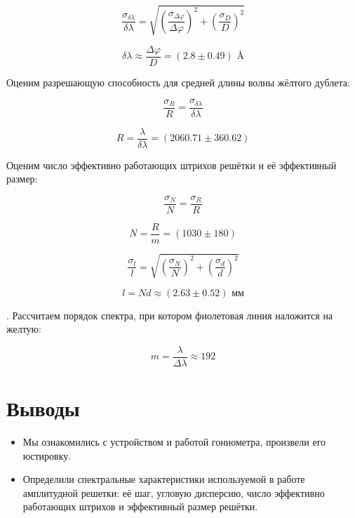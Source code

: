 \documentclass[a4paper, 12pt]{article}
\begin{document}
\[\dfrac{\sigma_{\delta \lambda}}{\delta \lambda} = \sqrt{\left(\dfrac{\sigma_{\Delta \varphi}}{\Delta \varphi}\right)^2 + \left(\dfrac{\sigma_D}{D}\right)^2}\]

\[\delta \lambda \approx \dfrac{\Delta \varphi}{D} = (2.8 \pm 0.49) \text{ \AA}\]

Оценим разрешающую способность для средней длины волны жёлтого дублета:

\[\dfrac{\sigma_R}{R} = \dfrac{\sigma_{\delta\lambda}}{\delta \lambda}\]

\[R = \dfrac{\lambda}{\delta \lambda} = (2060.71 \pm 360.62)\] 

Оценим число эффективно работающих штрихов решётки и её эффективный размер:

\[\dfrac{\sigma_N}{N} = \dfrac{\sigma_R}{R}\]

\[N = \dfrac{R}{m} = (1030 \pm 180)\]

\[\dfrac{\sigma_l}{l} = \sqrt{\left(\dfrac{\sigma_N}{N}\right)^2 + \left(\dfrac{\sigma_d}{d}\right)^2}\]

\[l = Nd \approx (2.63 \pm 0.52) \text{ мм}\]

. Рассчитаем порядок спектра, при котором фиолетовая линия наложится на желтую:

\[m = \dfrac{\lambda}{\Delta \lambda} \approx 192\]

\section*{Выводы}

\begin{itemize}
\item Мы ознакомились с устройством и работой гониометра, произвели его юстировку.

\item Определили спектральные характеристики используемой в работе амплитудной решетки: её шаг, угловую дисперсию, число эффективно работающих штрихов и эффективный размер решётки.
\end{itemize}
 
\end{document}
